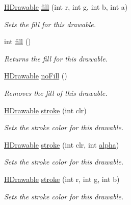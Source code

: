 \begin{DoxyCompactItemize}
\hyperlink{classhype_1_1drawable_1_1_h_drawable}{H\-Drawable} \hyperlink{classhype_1_1drawable_1_1_h_drawable_a27c54bd6420e20dc3966f407277986b4}{fill} (int r, int g, int b, int a)
\begin{DoxyCompactList}\small\item\em Sets the fill for this drawable. \end{DoxyCompactList}\item 
int \hyperlink{classhype_1_1drawable_1_1_h_drawable_a062e20742be8718d6069e7b50b1ebf36}{fill} ()
\begin{DoxyCompactList}\small\item\em Returns the fill for this drawable. \end{DoxyCompactList}\item 
\hyperlink{classhype_1_1drawable_1_1_h_drawable}{H\-Drawable} \hyperlink{classhype_1_1drawable_1_1_h_drawable_a079450cb1cd0463829ab1c8cb265c762}{no\-Fill} ()
\begin{DoxyCompactList}\small\item\em Removes the fill of this drawable. \end{DoxyCompactList}\item 
\hyperlink{classhype_1_1drawable_1_1_h_drawable}{H\-Drawable} \hyperlink{classhype_1_1drawable_1_1_h_drawable_a6c41a5164d1adab0d4592e88eaf27059}{stroke} (int clr)
\begin{DoxyCompactList}\small\item\em Sets the stroke color for this drawable. \end{DoxyCompactList}\item 
\hyperlink{classhype_1_1drawable_1_1_h_drawable}{H\-Drawable} \hyperlink{classhype_1_1drawable_1_1_h_drawable_a8b04db96fa8ce2c2d2298379c33022fe}{stroke} (int clr, int \hyperlink{classhype_1_1drawable_1_1_h_drawable_a03c7275f5caab5cc9034b18d4c2f1305}{alpha})
\begin{DoxyCompactList}\small\item\em Sets the stroke color for this drawable. \end{DoxyCompactList}\item 
\hyperlink{classhype_1_1drawable_1_1_h_drawable}{H\-Drawable} \hyperlink{classhype_1_1drawable_1_1_h_drawable_ac271a94299a2cfc04e999e474bd8e31e}{stroke} (int r, int g, int b)
\begin{DoxyCompactList}\small\item\em Sets the stroke color for this drawable. \end{DoxyCompactList}\item 

\end{DoxyCompactItemize}
